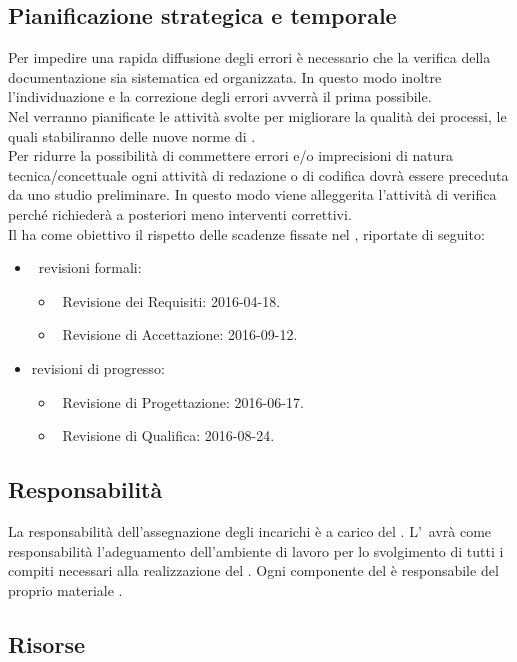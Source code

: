 	\subsection{Pianificazione strategica e temporale}
		Per impedire una rapida diffusione degli errori è necessario che la verifica della documentazione sia sistematica ed organizzata. In questo modo inoltre l'individuazione e la correzione degli errori avverrà il prima possibile. \\
		Nel \PPdoc verranno pianificate le attività svolte per migliorare la qualità dei processi, le quali stabiliranno delle nuove norme di . \\
		Per ridurre la possibilità di commettere errori e/o imprecisioni di natura tecnica/concettuale ogni attività di redazione o di codifica dovrà essere preceduta da uno studio preliminare. In questo modo viene alleggerita l'attività di verifica perché richiederà a posteriori meno interventi correttivi. \\
		Il  ha come obiettivo il rispetto delle scadenze fissate nel \PPdoc, riportate di seguito:
		\begin{itemize}
			\item\ revisioni formali:
			\begin{itemize}
				\item\ Revisione dei Requisiti: 2016-04-18.
				\item\ Revisione di Accettazione: 2016-09-12.
			\end{itemize}
			\item revisioni di progresso:
			\begin{itemize}
				\item\ Revisione di Progettazione: 2016-06-17.
				\item\ Revisione di Qualifica: 2016-08-24.
			\end{itemize}
		\end{itemize}
	\subsection{Responsabilità}
		La responsabilità dell'assegnazione degli incarichi è a carico del \RES. L'\AM\ avrà come responsabilità l'adeguamento dell'ambiente di lavoro per lo svolgimento di tutti i compiti necessari alla realizzazione del . Ogni componente del  è responsabile del proprio materiale .
	\subsection{Risorse}
